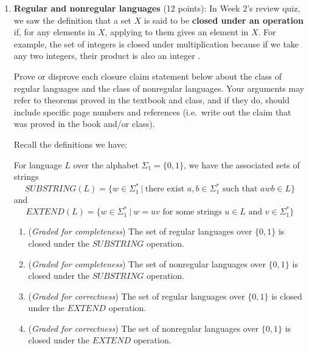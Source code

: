 \documentclass[12pt, oneside]{article}
\newcommand{\gradeCorrect}{({\it Graded for correctness}) }
\newcommand{\gradeComplete}{({\it Graded for completeness}) }
\begin{document}
\begin{enumerate}[wide, labelwidth=!, labelindent=0pt]
\begin{enumerate}
\item\gradeComplete In class and in the reading so far, we've seen the following examples of nonregular sets:
\begin{multicols}{3}
\begin{center}
$\{ 0^n 1^n ~|~ n \geq 0 \}$
$$\{ 0^n 1^n ~|~ n \geq 2 \}$$
$$\{ 0^n 1^m ~|~  0 \leq n \leq m \}$$
$$\{ 0^n 1^m ~|~ 0 \leq m \leq n \}$$
$$\{ 0^i 1^{2i} ~|~ 0 \leq i \}$$
$$\{ 0^i 1^{i+1} ~|~ 0 \leq i \}$$
$$\{ 0^n 1^m 0^n ~|~n,m \geq 0\}$$
$$\{ w \in \{0,1\}^* ~|~w = w^R\}$$
$$\{ w w^R ~|~ w \in \{0,1\}^*\}$$
\end{center}
\end{multicols}
Modify one of these sets in some way and use the Pumping Lemma to prove that the resulting set is still nonregular.

\end{enumerate}

\item\textbf{Regular and nonregular languages} (12 points):
In Week 2's review quiz, we saw the definition that a set $X$ is said to be 
{\bf closed under an operation} if, for any elements in
$X$, applying to them gives an element in $X$. For example, the set of
integers is closed under multiplication because if we take any two
integers, their product is also an integer .

Prove or disprove each closure claim statement below about the class of regular languages
and the class of nonregular languages.
Your arguments may refer to theorems proved in the textbook and class, and if they do, should 
include specific page numbers and references (i.e.\ write out the claim that was proved in the book 
and/or class).

Recall the definitions we have: 

For language $L$ over the alphabet $\Sigma_1 = \{0,1\}$, we have the 
associated sets of strings
\[
   SUBSTRING(L) = \{ w \in \Sigma_1^* ~|~ \text{there exist } a,b \in \Sigma_1^* \text{ such that } awb \in L\}
\]
and 
\[
  EXTEND(L) = \{ w \in \Sigma_1^* ~|~ w = uv \text{ for some strings } u \in L \text{ and } v \in \Sigma_1^* \}
\]
\begin{enumerate} 
   \item \gradeComplete The set of regular languages over $\{0,1\}$ is closed under the $SUBSTRING$ operation.

   \item \gradeComplete The set of nonregular languages over $\{0,1\}$ is closed under the $SUBSTRING$ operation.

   \item \gradeCorrect The set of regular languages over $\{0,1\}$ is closed under the $EXTEND$ operation.

   \item \gradeCorrect The set of nonregular languages over $\{0,1\}$ is closed under the $EXTEND$ operation.
\end{enumerate}

\end{enumerate}
\newpage
\end{document}
